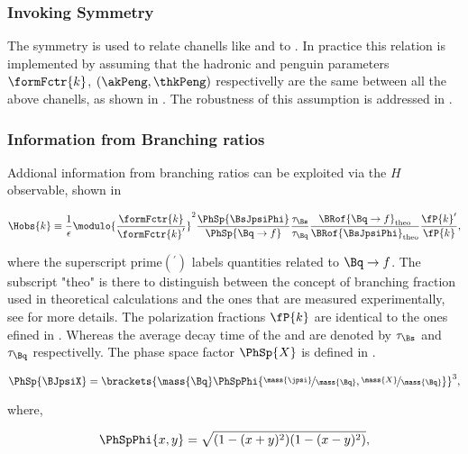 \subsubsection{Invoking \grpsuthree Symmetry}
The \grpsuthree symmetry is used to relate chanells like \BsJpsiKst and \BsJpsiRho to \BsJpsiPhi.
In practice this relation is implemented by assuming that the hadronic and penguin parameters
 $\formFctr{k}$, $(\akPeng,\thkPeng)$ respectivelly are the same between all the above chanells,
as shown in . The robustness of this assumption is addressed in .

\subsubsection{Information from Branching ratios}
Addional information from branching ratios can be exploited via the $H$ observable, shown in 

\begin{equation}
\centering
  \Hobs{k} \equiv   \frac{1}{\epsilon}
            \modulo{\frac{\formFctr{k}}{\formFctr{k}'}}^2
                    \frac{\PhSp{\BsJpsiPhi}} {\PhSp{\Bq\to f}}
                    \frac{\tau_{\Bs}}{\tau_{\Bq}}
                    \frac{\BRof{\Bq\to f}_{\rm theo}}{\BRof{\BsJpsiPhi}_{\rm theo}}
                    \frac{\fP{k}'}{{\fP{k}}},
\label{hobs_def}
\end{equation}

\noindent where the superscript prime$({}^\prime)$ labels quantities related to $\Bq\to f$. The subscript "theo" is there to distinguish
between the concept of branching fraction used in theoretical calculations and the ones that are measured experimentally,
see  for more details. The polarization fractions $\fP{k}$ are identical to the ones
efined in . Whereas the average decay time of the \Bs and \Bq are denoted by $\tau_{\Bs}$ and $\tau_{\Bq}$
respectivelly. The phase space factor $\PhSp{X}$ is defined in .

\begin{equation}
\centering
   \PhSp{\BJpsiX}  = \brackets{ \mass{\Bq} \PhSpPhi{ \nicefrac{\mass{\jpsi}}{\mass{\Bq}}, \nicefrac{\mass{X}}{\mass{\Bq}}  } }^3,
\label{phase_space_eq_def}
\end{equation}

\noindent where,

\begin{equation}
\centering
   \PhSpPhi{x,y} = \sqrt{ (1-(x+y)^2)(1-(x-y)^2) },
\label{phase_space_phi_eq_def}
\end{equation}


